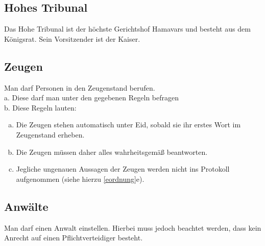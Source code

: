 \documentclass{article}
\begin{document}
\subsection{Hohes Tribunal}
Das Hohe Tribunal ist der höchste Gerichtshof Hamavars und besteht aus dem Königsrat. Sein Vorsitzender ist der Kaiser.

\subsection{Zeugen}\label{zeugen}
Man darf Personen in den Zeugenstand berufen.\\
a. Diese darf man unter den gegebenen Regeln befragen  \\
b. Diese Regeln lauten:  \\
\begin{enumerate}[a)]
	\item Die Zeugen stehen automatisch unter Eid, sobald sie ihr erstes Wort im Zeugenstand erheben.
	\item Die Zeugen müssen daher alles wahrheitsgemäß beantworten.
	\item Jegliche ungenauen Aussagen der Zeugen werden nicht ins Protokoll aufgenommen (siehe hierzu \ref{eordnung}e).
\end{enumerate}

\subsection{Anwälte}
Man darf einen Anwalt einstellen. Hierbei muss jedoch beachtet werden, dass kein Anrecht auf einen Pflichtverteidiger besteht.
\end{document}
